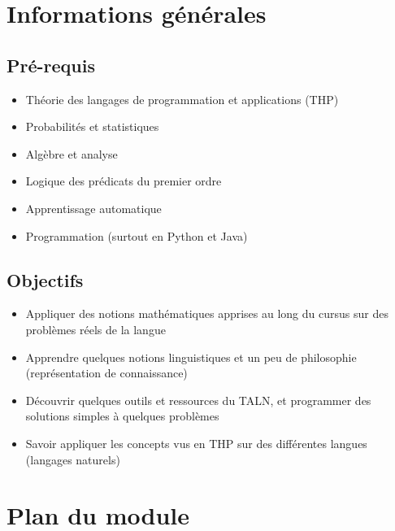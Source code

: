 \documentclass[11pt, a4paper]{article}
\begin{document}
\section{Informations générales}

\begin{minipage}{0.49\textwidth}

\subsection{Pré-requis}

\begin{itemize}
	\item Théorie des langages de programmation et applications (THP)
	\item Probabilités et statistiques
	\item Algèbre et analyse 
	\item Logique des prédicats du premier ordre
	\item Apprentissage automatique 
	\item Programmation (surtout en Python et Java)
\end{itemize}
\end{minipage}
\begin{minipage}{0.49\textwidth}


\subsection{Objectifs}

\begin{itemize}
	\item Appliquer des notions mathématiques apprises au long du cursus sur des problèmes réels de la langue 
	\item Apprendre quelques notions linguistiques et un peu de philosophie (représentation de connaissance) 
	\item Découvrir quelques outils et ressources du TALN, et programmer des solutions simples à quelques problèmes
	\item Savoir appliquer les concepts vus en THP sur des différentes langues (langages naturels)
\end{itemize}
\end{minipage}

\section{Plan du module}
\end{document}
